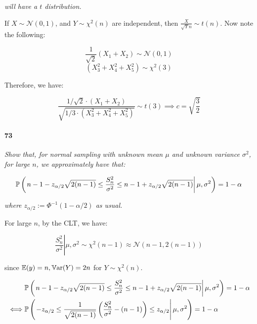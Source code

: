         \textit{will have a $t$ distribution.}

            If $X \sim \mathcal{N}(0, 1)$, and $Y \sim \chi^2(n)$ are
            independent, then $\frac{X}{\sqrt{Y}{n}} \sim t(n)$. Now note the
            following:

            \[
                \frac{1}{\sqrt{2}} (X_1 + X_2) \sim \mathcal{N}(0, 1)
            \]
            \[
                (X_3^2 + X_4^2 + X_5^2) \sim \chi^2(3)
            \]

            Therefore, we have:

            \[
                \frac{1/\sqrt{2} \cdot (X_1 + X_2)}{\sqrt{1/3 \cdot (X_3^2 +
                X_4^2 + X_5^2)}} \sim t(3) \implies c = \sqrt{\frac{3}{2}}
            \]

        \paragraph{73}
        \textit{Show that, for normal sampling with unknown mean $\mu$ and
        unknown variance $\sigma^2$, for large $n$, we approximately have
        that:}

        \[
            \mathbb{P}\left(\left.n - 1 - z_{\alpha/2}\sqrt{2(n - 1)} \leq
            \frac{S_n^2}{\sigma^2} \leq n - 1 + z_{\alpha/2}\sqrt{2(n - 1)}
            \right|\mu, \sigma^2\right) = 1 - \alpha
        \]

        \textit{where $z_{\alpha/2} := \Phi^{-1}(1 - \alpha/2)$ as usual.}

            For large $n$, by the CLT, we have:

            \[
                \left.\frac{S_n^2}{\sigma^2}\right|\mu, \sigma^2 \sim
                \chi^2(n -1) \approx \mathcal{N}(n - 1, 2(n - 1))
            \]

            since $\mathbb{E}(y) = n, \mathbb{V}\text{ar}(Y) = 2n$ for $Y \sim \chi^2(n)$.

            \begin{align*}
                & \mathbb{P}\left(\left.n - 1 - z_{\alpha/2}\sqrt{2(n - 1)} \leq
                    \frac{S_n^2}{\sigma^2} \leq n - 1 + z_{\alpha/2}
                    \sqrt{2(n - 1)} \right|\mu, \sigma^2\right) = 1 - \alpha
                    \\
                \iff & \mathbb{P}\left(\left.-z_{\alpha/2} \leq \frac{1}{\sqrt{2
                    (n-1)}}\left(\frac{S_n^2}{\sigma^2} - (n - 1)\right)
                    \leq z_{\alpha/2}\right|\mu, \sigma^2\right) = 1 -
                    \alpha
            \end{align*}

